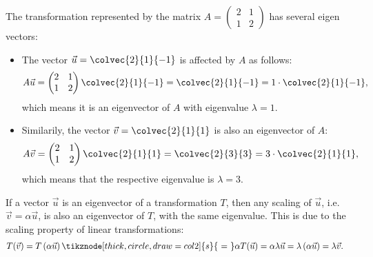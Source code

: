 \begin{example}
  The transformation represented by the matrix $A=\begin{pmatrix} 2 & 1 \\ 1 & 2\end{pmatrix}$ has several eigen vectors:
  
  \begin{itemize}
	\item The vector $\vec{u}=\colvec{2}{1}{-1}$ is affected by $A$ as follows:
		  \begin{equation*}
			A\vec{u} = \begin{pmatrix} 2 & 1 \\ 1 & 2 \end{pmatrix}\colvec{2}{1}{-1} = \colvec{2}{1}{-1} = 1\cdot\colvec{2}{1}{-1},
		  \end{equation*}
		  which means it is an eigenvector of $A$ with eigenvalue $\lambda=1$.
  
	\item Similarily, the vector $\vec{v}=\colvec{2}{1}{1}$ is also an eigenvector of $A$:
		  \begin{equation*}
			A\vec{v} = \begin{pmatrix} 2 & 1 \\ 1 & 2 \end{pmatrix}\colvec{2}{1}{1} = \colvec{2}{3}{3} = 3\cdot\colvec{2}{1}{1},
		  \end{equation*}
		  which means that the respective eigenvalue is $\lambda=3$.
  \end{itemize}
\end{example}

If a vector $\vec{u}$ is an eigenvector of a transformation $T$, then any scaling of $\vec{u}$, i.e. $\vec{v}=\alpha\vec{u}$, is also an eigenvector of $T$, with the same eigenvalue. This is due to the scaling property of linear transformations:
\begin{align*}
  T(\vec{v}) &= T\left(\alpha\vec{u}\right) \tikznode[thick, circle, draw=col2]{s}{\ =\ } \alpha T(\vec{u}) = \alpha \lambda \vec{u} = \lambda \left(\alpha \vec{u}\right) = \lambda\vec{v}.
\end{align*}

